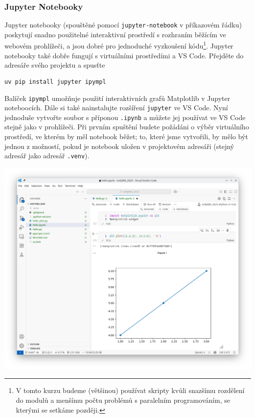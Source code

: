 \subsubsection{Jupyter Notebooky}
Jupyter notebooky (spouštěné pomocí \verb|jupyter-notebook| v příkazovém řádku) poskytují snadno použitelné interaktivní prostředí s rozhraním běžícím ve webovém prohlížeči, a jsou dobré pro jednoduché vyzkoušení kódu\footnote{V tomto kurzu budeme (většinou) používat skripty kvůli snazšímu rozdělení do modulů a menšímu počtu problémů s paralelním programováním, se kterými se setkáme později.}. Jupyter notebooky také dobře fungují s virtuálními prostředími a VS Code. Přejděte do adresáře svého projektu a spusťte
\begin{lstlisting}
uv pip install jupyter ipympl
\end{lstlisting}
Balíček \verb|ipympl| umožňuje použití interaktivních grafů Matplotlib v Jupyter noteboocích. Dále si také nainstalujte rozšíření \verb|jupyter| ve VS Code. Nyní jednoduše vytvořte soubor s příponou \verb|.ipynb| a můžete jej používat ve VS Code stejně jako v prohlížeči. Při prvním spuštění budete požádáni o výběr virtuálního prostředí, ve kterém by měl notebook běžet; to, které jsme vytvořili, by mělo být jednou z možností, pokud je notebook uložen v projektovém adresáři (stejný adresář jako adresář \verb|.venv|).

\begin{center}
    \includegraphics[width=0.9\linewidth]{vscode_jupyter.png}
\end{center}